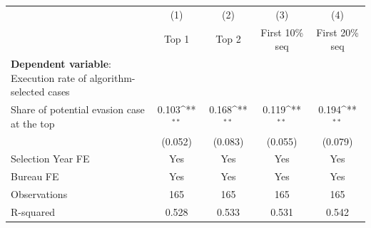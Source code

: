 {
\def\sym#1{\ifmmode^{#1}\else\(^{#1}\)\fi}
\begin{tabular}{l*{4}{c}}
\toprule
            &\multicolumn{1}{c}{(1)}&\multicolumn{1}{c}{(2)}&\multicolumn{1}{c}{(3)}&\multicolumn{1}{c}{(4)}\\
            &\multicolumn{1}{c}{Top 1}&\multicolumn{1}{c}{Top 2}&\multicolumn{1}{c}{First 10\% seq}&\multicolumn{1}{c}{First 20\% seq}\\
\midrule
\textbf{Dependent variable}: Execution rate of algorithm-selected cases&                     &                     &                     &                     \\
\addlinespace
Share of potential evasion case at the top&       0.103\sym{**} &       0.168\sym{**} &       0.119\sym{**} &       0.194\sym{**} \\
            &     (0.052)         &     (0.083)         &     (0.055)         &     (0.079)         \\
\midrule
Selection Year FE&         Yes         &         Yes         &         Yes         &         Yes         \\
Bureau FE   &         Yes         &         Yes         &         Yes         &         Yes         \\
Observations&         165         &         165         &         165         &         165         \\
R-squared   &       0.528         &       0.533         &       0.531         &       0.542         \\
\bottomrule
\end{tabular}
}
